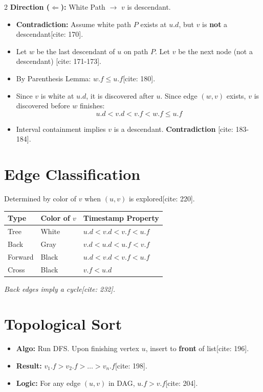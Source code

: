 \documentclass[a4paper,10pt]{article}
\begin{document}
\begin{multicols*}{2}
\textbf{Direction ($\Leftarrow$):} White Path $\to$ $v$ is descendant.
\begin{itemize}[leftmargin=*]
    \item \textbf{Contradiction:} Assume white path $P$ exists at $u.d$, but $v$ is \textbf{not} a descendant[cite: 170].
    \item Let $w$ be the last descendant of $u$ on path $P$. Let $v$ be the next node (not a descendant) [cite: 171-173].
    \item By Parenthesis Lemma: $w.f \le u.f$[cite: 180].
    \item Since $v$ is white at $u.d$, it is discovered after $u$. Since edge $(w,v)$ exists, $v$ is discovered before $w$ finishes:
    $$ u.d < v.d < v.f < w.f \le u.f $$
    \item Interval containment implies $v$ is a descendant. \textbf{Contradiction} [cite: 183-184].
\end{itemize}

\section{Edge Classification}
Determined by color of $v$ when $(u,v)$ is explored[cite: 220].

\begin{center}
\begin{tabular}{|l|l|l|}
\hline
\textbf{Type} & \textbf{Color of $v$} & \textbf{Timestamp Property} \\
\hline
Tree & White & $u.d < v.d < v.f < u.f$ \\
Back & Gray & $v.d < u.d < u.f < v.f$ \\
Forward & Black & $u.d < v.d < v.f < u.f$ \\
Cross & Black & $v.f < u.d$ \\
\hline
\end{tabular}
\end{center}
\small{\textit{Back edges imply a cycle[cite: 232].}}

\section{Topological Sort}
\begin{itemize}[leftmargin=*]
    \item \textbf{Algo:} Run DFS. Upon finishing vertex $u$, insert to \textbf{front} of list[cite: 196].
    \item \textbf{Result:} $v_1.f > v_2.f > \dots > v_n.f$[cite: 198].
    \item \textbf{Logic:} For any edge $(u,v)$ in DAG, $u.f > v.f$[cite: 204].
\end{itemize}

\end{multicols*}
\end{document}
